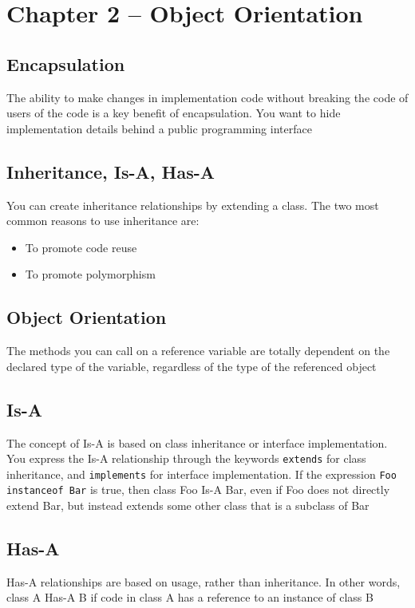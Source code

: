 \section{Chapter 2 -- Object Orientation}
\subsection{Encapsulation}
The ability to make changes in implementation code without breaking the code of 
users of the code is a key benefit of encapsulation. You want to hide 
implementation details behind a public programming interface

\subsection{Inheritance, Is-A, Has-A}
You can create inheritance relationships by extending a class. The two most 
common reasons to use inheritance are:
\begin{itemize}
    \item To promote code reuse
    \item To promote polymorphism
\end{itemize}

\subsection{Object Orientation}
The methods you can call on a reference variable are totally dependent on the 
declared type of the variable, regardless of the type of the referenced object

\subsection{Is-A}
The concept of Is-A is based on class inheritance or interface implementation.  
You express the Is-A relationship through the keywords \verb#extends# for class 
inheritance, and \verb#implements# for interface implementation. If the 
expression \verb#Foo instanceof Bar# is true, then class Foo Is-A Bar, even if 
Foo does not directly extend Bar, but instead extends some other class that is 
a subclass of Bar

\subsection{Has-A}
Has-A relationships are based on usage, rather than inheritance. In other 
words, class A Has-A B if code in class A has a reference to an instance of 
class B

